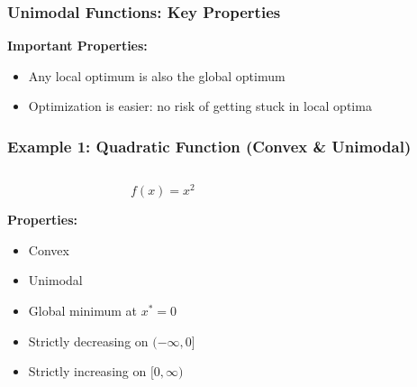 \documentclass{beamer}
\begin{document}
\begin{frame}
\frametitle{Unimodal Functions: Key Properties}
\textbf{Important Properties:}
\begin{itemize}
    \item Any local optimum is also the global optimum
    \item Optimization is easier: no risk of getting stuck in local optima
\end{itemize}

\vspace{0.5cm}

\end{frame}

\begin{frame}
\frametitle{Example 1: Quadratic Function (Convex \& Unimodal)}
\begin{columns}
\begin{column}{0.5\textwidth}
$$f(x) = x^2$$

\vspace{0.3cm}

\textbf{Properties:}
\begin{itemize}
    \item Convex
    \item Unimodal
    \item Global minimum at $x^* = 0$
    \item Strictly decreasing on $(-\infty, 0]$
    \item Strictly increasing on $[0, \infty)$
\end{itemize}
\end{column}
\begin{column}{0.5\textwidth}
\end{column}
\end{columns}
\end{frame}
\end{document}
